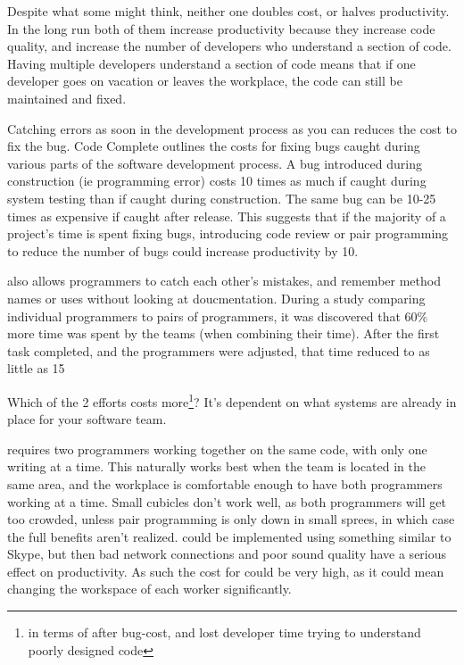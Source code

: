 \documentclass{article}
\begin{document}
Despite what some might think, neither one doubles cost, or halves productivity. In the long run both of them increase productivity because they increase code quality, and increase the number of developers who understand a section of code. Having multiple developers understand a section of code means that if one developer goes on vacation or leaves the workplace, the code can still be maintained and fixed.

Catching errors as soon in the development process as you can reduces the cost to fix the bug. Code Complete\cite[Table 3.1]{McConnell:2004:CCS:1096143} outlines the costs for fixing bugs caught during various parts of the software development process. A bug introduced during construction (ie programming error) costs 10 times as much if caught during system testing than if caught during construction. The same bug can be 10-25 times as expensive if caught after release. This suggests that if the majority of a project's time is spent fixing bugs, introducing code review or pair programming to reduce the number of bugs could increase productivity by 10.

\PP also allows programmers to catch each other's mistakes, and remember method names or uses without looking at doucmentation. During a study comparing individual programmers to pairs of programmers, it was discovered that 60\% more time was spent by the teams (when combining their time). After the first task completed, and the programmers were adjusted, that time reduced to as little as 15%

Which of the 2 efforts costs more\footnote{in terms of after bug-cost, and lost developer time trying to understand poorly designed code}? It's dependent on what systems are already in place for your software team. 

\PP requires two programmers working together on the same code, with only one writing at a time. This naturally works best when the team is located in the same area, and the workplace is comfortable enough to have both programmers working at a time. Small cubicles don't work well, as both programmers will get too crowded, unless pair programming is only down in small sprees, in which case the full benefits aren't realized. \PP could be implemented using something similar to Skype, but then bad network connections and poor sound quality have a serious effect on productivity. As such the cost for \PP could be very high, as it could mean changing the workspace of each worker significantly.
\end{document}
